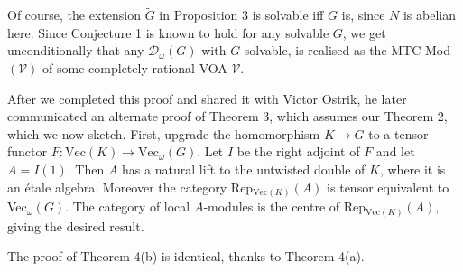 \documentclass[12pt]{article}
\numberwithin{equation}{section}
\def\cD            {{\mathcal{D}}}
\def\cV            {{\mathcal{V}}}
\begin{document}
Of course, the extension $\widetilde{G}$ in Proposition 3 is solvable iff $G$ is, since $N$ is abelian here.
Since Conjecture 1 is known to hold for any solvable $G$, we get unconditionally that any $\cD_\omega(G)$ with $G$ solvable, is realised as the MTC Mod$(\cV)$ of some completely rational VOA
$\cV$.

After we completed this proof and shared it with Victor Ostrik, he later communicated an alternate proof of Theorem 3, which assumes our Theorem 2, which we now sketch. First, upgrade the homomorphism $K\rightarrow G$ to a tensor functor
$F: \mathrm{Vec}({K})\rightarrow \mathrm{Vec}_\omega(G)$. 
Let $I$ be the right adjoint of $F$ and let $A=I(1)$. Then $A$ has a natural lift
to the untwisted double of $K$, where it is an \'etale algebra.
Moreover the category Rep$_{\mathrm{Vec}({K})}(A)$ is tensor equivalent to Vec$_\omega(G)$.
The category of local $A$-modules is  
the centre of Rep$_{\mathrm{Vec}({K})}(A)$, giving the desired result.

The proof of Theorem 4(b) is identical, thanks to Theorem 4(a).






\newcommand\biba[7]   {\bibitem{#1} {#2:} {\sl #3.} {\rm #4} {\bf #5,}
                    {#6 } {#7}}
                    \newcommand\bibx[4]   {\bibitem{#1} {#2:} {\sl #3} {\rm #4}}

\def\ASENS            {Ann. Sci. \'Ec. Norm. Sup.}
\def\AM   {Acta Math.}
   \def\AnM              {Ann. Math.}
   \def\CMP              {Commun.\ Math.\ Phys.}
   \def\IJM              {Internat.\ J. Math.}
   \def\JAMS             {J. Amer. Math. Soc.}
\def\JFA              {J.\ Funct.\ Anal.}
\def\JMP              {J.\ Math.\ Phys.}
\def\JRA              {J. Reine Angew. Math.}
\def\JSP              {J.\ Stat.\ Physics}
\def\LMP              {Lett.\ Math.\ Phys.}
\def\RMP              {Rev.\ Math.\ Phys.}
\def\RNM              {Res.\ Notes\ Math.}
\def\RIMS             {Publ.\ RIMS.\ Kyoto Univ.}
\def\Inv              {Invent.\ Math.}
\def\npbp             {Nucl.\ Phys.\ {\bf B} (Proc.\ Suppl.)}
\def\nupb             {Nucl.\ Phys.\ {\bf B}}
\def\nup              {Nucl.\ Phys. }
\def\nupp             {Nucl.\ Phys.\ (Proc.\ Suppl.) }
\def\adma             {Adv.\ Math.}
\def\coma             {Con\-temp.\ Math.}
\def\PAMS             {Proc. Amer. Math. Soc.}
\def\PJM              {Pacific J. Math.}
\def\ijmp             {Int.\ J.\ Mod.\ Phys.\ {\bf A}}
\def\jpa              {J.\ Phys.\ {\bf A}}
\def\PLB              {Phys.\ Lett.\ {\bf B}}
\def\RIMS             {Publ.\ RIMS, Kyoto Univ.}
\def\Top               {Topology}
\def\TAMS             {Trans.\ Amer.\ Math.\ Soc.}
\end{document}
